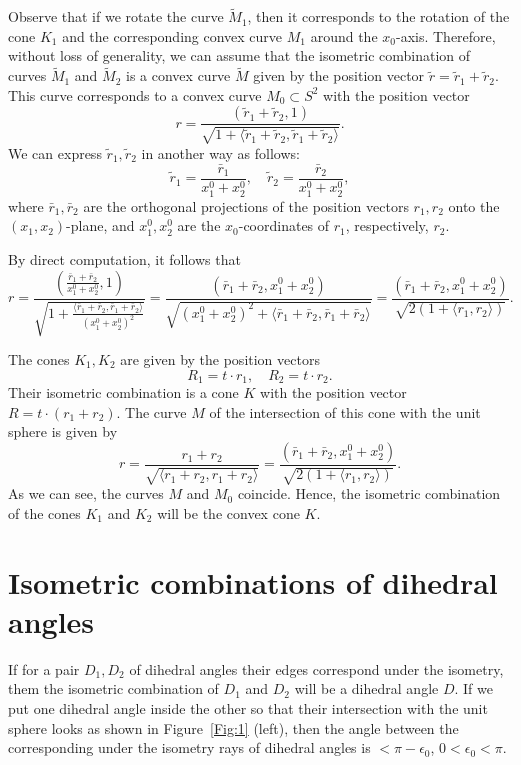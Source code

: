 \documentclass[11pt,oneside]{amsart}
\theoremstyle{theorem}
\theoremstyle{definition}
\theoremstyle{remark}
\begin{document}
Observe that if we rotate the curve $\tilde M_1$, then it corresponds to the rotation of the cone $K_1$ and the corresponding convex curve $M_1$ around the $x_0$-axis. Therefore, without loss of generality, we can assume that the isometric combination of curves $\tilde M_1$ and $\tilde M_2$ is a convex curve $\tilde M$ given by the position vector $\tilde r = \tilde r_1 + \tilde r_2$. This curve corresponds to a convex curve $M_0 \subset S^2$ with the position vector
\[
r = \frac{(\tilde r_1 + \tilde r_2, 1)}{\sqrt{1 + \langle \tilde r_1 + \tilde r_2, \tilde r_1 + \tilde r_2 \rangle}}.
\]
We can express $\tilde r_1, \tilde r_2$ in another way as follows:
\[
\tilde r_1 = \frac{\bar r_1}{x_1^0 + x_2^0}, \quad \tilde r_2 = \frac{\bar r_2}{x_1^0 + x_2^0} ,
\]
where $\bar r_1, \bar r_2$ are the orthogonal projections of the position vectors $r_1, r_2$ onto the $(x_1, x_2)$-plane, and $x_1^0, x_2^0$ are the $x_0$-coordinates of $r_1$, respectively, $r_2$.

By direct computation, it follows that
\[
r = \frac{\left(\frac{\bar r_1 + \bar r_2}{x_1^0 + x_2^0}, 1\right)}{\sqrt{1 + \frac{\langle \bar r_1 + \bar r_2, \bar r_1 + \bar r_2 \rangle}{(x_1^0 + x_2^0)^2}}} = \frac{\left({\bar r_1 + \bar r_2}, {x_1^0 + x_2^0}\right)}{\sqrt{\left(x_1^0+x_2^0\right)^2 + \langle \bar r_1 + \bar r_2, \bar r_1 + \bar r_2 \rangle}} = \frac{(\bar r_1 + \bar r_2, x_1^0 + x_2^0)}{\sqrt{2(1 + \langle r_1, r_2 \rangle)}}.
\]

The cones $K_1, K_2$ are given by the position vectors
\[
R_1 = t \cdot r_1, \quad R_2 = t \cdot r_2.
\]
Their isometric combination is a cone $K$ with the position vector $R = t \cdot (r_1 + r_2)$. The curve $M$ of the intersection of this cone with the unit sphere is given by
\[
r = \frac{r_1 + r_2}{\sqrt{\langle r_1 + r_2, r_1 + r_2\rangle}} = \frac{(\bar r_1 + \bar r_2, x_1^0 + x_2^0)}{\sqrt{2(1 + \langle r_1, r_2 \rangle)}}.
\]
As we can see, the curves $M$ and $M_0$ coincide. Hence, the isometric combination of the cones $K_1$ and $K_2$ will be the convex cone $K$.

\section{Isometric combinations of dihedral angles}

If for a pair $D_1, D_2$ of dihedral angles their edges correspond under the isometry, them the isometric combination of $D_1$ and $D_2$ will be a dihedral angle $D$. If we put one dihedral angle inside the other so that their intersection with the unit sphere looks as shown in Figure~\ref{Fig:1} (left), then the angle between the corresponding under the isometry rays of dihedral angles is $< \pi - \epsilon_0$, $0 < \epsilon_0 < \pi$. 
\end{document}
